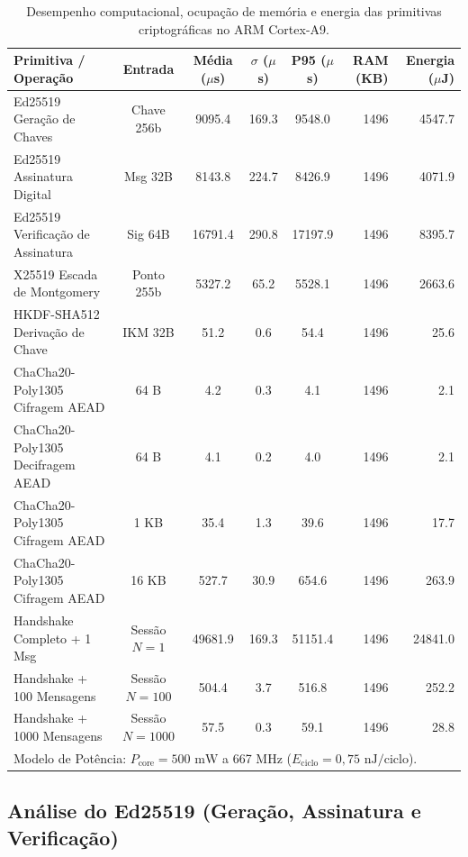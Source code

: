 \begin{table}[htbp]
\centering
\caption{Desempenho computacional, ocupação de memória e energia das primitivas criptográficas no ARM Cortex-A9.}
\label{tab:desempenho_primitivas_cortex_a9}
\begin{tabular}{lccccrr}
\hline
\textbf{Primitiva / Operação} & \textbf{Entrada} & \textbf{Média ($\mu$s)} & \textbf{$\sigma$ ($\mu$s)} & \textbf{P95 ($\mu$s)} & \textbf{RAM (KB)} & \textbf{Energia ($\mu$J)} \\
\hline
Ed25519 Geração de Chaves & Chave 256b & 9095.4 & 169.3 & 9548.0 & 1496 & 4547.7 \\
Ed25519 Assinatura Digital & Msg 32B & 8143.8 & 224.7 & 8426.9 & 1496 & 4071.9 \\
Ed25519 Verificação de Assinatura & Sig 64B & 16791.4 & 290.8 & 17197.9 & 1496 & 8395.7 \\
X25519 Escada de Montgomery & Ponto 255b & 5327.2 & 65.2 & 5528.1 & 1496 & 2663.6 \\
HKDF-SHA512 Derivação de Chave & IKM 32B & 51.2 & 0.6 & 54.4 & 1496 & 25.6 \\
ChaCha20-Poly1305 Cifragem AEAD & 64 B & 4.2 & 0.3 & 4.1 & 1496 & 2.1 \\
ChaCha20-Poly1305 Decifragem AEAD & 64 B & 4.1 & 0.2 & 4.0 & 1496 & 2.1 \\
ChaCha20-Poly1305 Cifragem AEAD & 1 KB & 35.4 & 1.3 & 39.6 & 1496 & 17.7 \\
ChaCha20-Poly1305 Cifragem AEAD & 16 KB & 527.7 & 30.9 & 654.6 & 1496 & 263.9 \\
\hline
Handshake Completo + 1 Msg & Sessão $N=1$ & 49681.9 & 169.3 & 51151.4 & 1496 & 24841.0 \\
Handshake + 100 Mensagens & Sessão $N=100$ & 504.4 & 3.7 & 516.8 & 1496 & 252.2 \\
Handshake + 1000 Mensagens & Sessão $N=1000$ & 57.5 & 0.3 & 59.1 & 1496 & 28.8 \\
\hline
\multicolumn{7}{l}{\footnotesize Modelo de Potência: $P_{\text{core}} = 500\text{ mW}$ a 667 MHz ($E_{\text{ciclo}} = 0{,}75\text{ nJ/ciclo}$).} \\
\end{tabular}
\end{table}

\subsection{Análise do Ed25519 (Geração, Assinatura e Verificação)}
\label{subsec:analise_ed25519}

